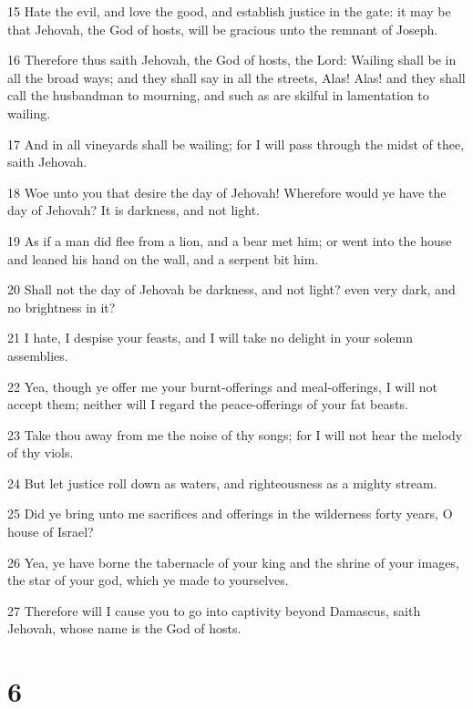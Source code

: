 \par 15 Hate the evil, and love the good, and establish justice in the gate: it may be that Jehovah, the God of hosts, will be gracious unto the remnant of Joseph.
\par 16 Therefore thus saith Jehovah, the God of hosts, the Lord: Wailing shall be in all the broad ways; and they shall say in all the streets, Alas! Alas! and they shall call the husbandman to mourning, and such as are skilful in lamentation to wailing.
\par 17 And in all vineyards shall be wailing; for I will pass through the midst of thee, saith Jehovah.
\par 18 Woe unto you that desire the day of Jehovah! Wherefore would ye have the day of Jehovah? It is darkness, and not light.
\par 19 As if a man did flee from a lion, and a bear met him; or went into the house and leaned his hand on the wall, and a serpent bit him.
\par 20 Shall not the day of Jehovah be darkness, and not light? even very dark, and no brightness in it?
\par 21 I hate, I despise your feasts, and I will take no delight in your solemn assemblies.
\par 22 Yea, though ye offer me your burnt-offerings and meal-offerings, I will not accept them; neither will I regard the peace-offerings of your fat beasts.
\par 23 Take thou away from me the noise of thy songs; for I will not hear the melody of thy viols.
\par 24 But let justice roll down as waters, and righteousness as a mighty stream.
\par 25 Did ye bring unto me sacrifices and offerings in the wilderness forty years, O house of Israel?
\par 26 Yea, ye have borne the tabernacle of your king and the shrine of your images, the star of your god, which ye made to yourselves.
\par 27 Therefore will I cause you to go into captivity beyond Damascus, saith Jehovah, whose name is the God of hosts.

\chapter{6}

